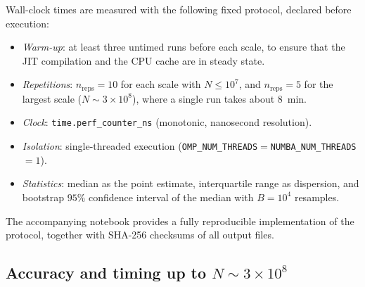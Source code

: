 \documentclass[11pt]{amsart}
\numberwithin{equation}{section}
\theoremstyle{plain}
\theoremstyle{definition}
\begin{document}
Wall-clock times are measured with the following fixed protocol,
declared before execution:
\begin{itemize}
\item \emph{Warm-up}: at least three untimed runs before each scale,
  to ensure that the JIT compilation and the CPU cache are in steady
  state.
\item \emph{Repetitions}: $n_{\mathrm{reps}}=10$ for each scale with
  $N\le 10^7$, and $n_{\mathrm{reps}}=5$ for the largest scale
  ($N\sim 3\times 10^8$), where a single run takes about $8$~min.
\item \emph{Clock}: \texttt{time.perf\_counter\_ns} (monotonic,
  nanosecond resolution).
\item \emph{Isolation}: single-threaded execution
  (\texttt{OMP\_NUM\_THREADS}$=$\texttt{NUMBA\_NUM\_THREADS}$=1$).
\item \emph{Statistics}: median as the point estimate, interquartile
  range as dispersion, and bootstrap $95\%$ confidence interval of the
  median with $B=10^4$ resamples.
\end{itemize}

The accompanying notebook \cite{PeinadorATMSupp} provides a fully
reproducible implementation of the protocol, together with SHA-256
checksums of all output files.

\subsection{Accuracy and timing up to \texorpdfstring{$N\sim 3\times 10^8$}{N \textasciitilde\ 3 x 10\textasciicircum 8}}
\label{subsec:accuracy}
\end{document}
